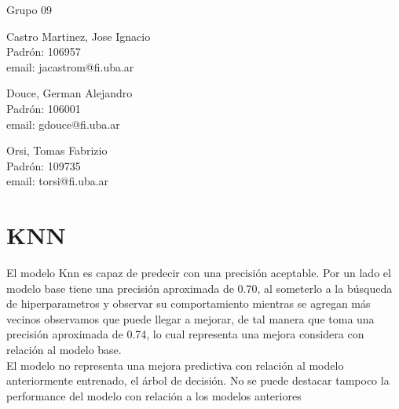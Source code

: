 \documentclass{article}
\begin{document}
\begin{titlepage}
  \vspace{0.4cm}
  \begin{center}
    {\Large{Grupo 09}}\\
    \vspace{0.6cm}
    {\begin{minipage}[t]{.32\textwidth}
        \begin{center}
	Castro  Martinez, Jose Ignacio\\
          {\small{Padrón: 106957}}\\
          {\small{email: jacastrom@fi.uba.ar}}
        \end{center}
	\end{minipage}
	\begin{minipage}[t]{.32\textwidth}
        \begin{center}
	Douce, German Alejandro\\
          {\small{Padrón: 106001}}\\
          {\small{email: gdouce@fi.uba.ar}}\\
        \end{center}
      \end{minipage}
      \begin{minipage}[t]{.32\textwidth}
        \begin{center}
          Orsi, Tomas Fabrizio\\
          {\small{Padrón: 109735}}\\
          {\small{email: torsi@fi.uba.ar}}
        \end{center}
      \end{minipage}}
  \end{center}
\end{titlepage}

\section*{KNN} 

El modelo Knn es capaz de predecir con una precisión aceptable. Por un lado el modelo base tiene una precisión aproximada de 0.70, al someterlo a la búsqueda de hiperparametros y observar su comportamiento mientras se agregan más vecinos observamos que puede llegar a mejorar, de tal manera que toma una precisión aproximada de 0.74, lo cual representa una mejora considera con relación al modelo base. \\
El modelo no representa una mejora predictiva con relación al modelo anteriormente entrenado, el árbol de decisión. No se puede destacar tampoco la performance del modelo con relación a los modelos anteriores
\end{document}
